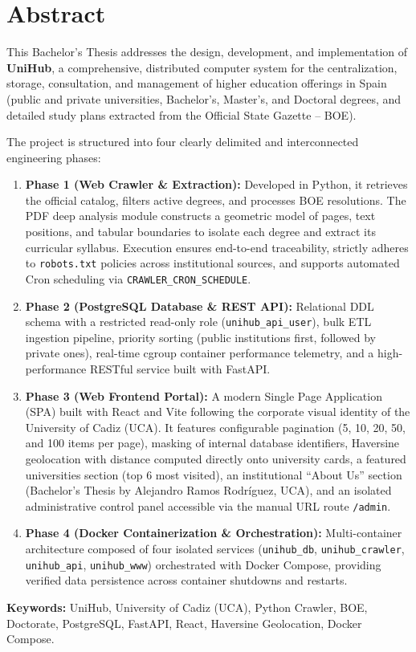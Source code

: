 \newpage{\ }
\thispagestyle{empty}
\chapter*{Abstract}

\noindent This Bachelor's Thesis addresses the design, development, and implementation of \textbf{UniHub}, a comprehensive, distributed computer system for the centralization, storage, consultation, and management of higher education offerings in Spain (public and private universities, Bachelor's, Master's, and Doctoral degrees, and detailed study plans extracted from the Official State Gazette -- BOE).

The project is structured into four clearly delimited and interconnected engineering phases:
\begin{enumerate}
    \item \textbf{Phase 1 (Web Crawler \& Extraction):} Developed in Python, it retrieves the official catalog, filters active degrees, and processes BOE resolutions. The PDF deep analysis module constructs a geometric model of pages, text positions, and tabular boundaries to isolate each degree and extract its curricular syllabus. Execution ensures end-to-end traceability, strictly adheres to \texttt{robots.txt} policies across institutional sources, and supports automated Cron scheduling via \texttt{CRAWLER\_CRON\_SCHEDULE}.
    \item \textbf{Phase 2 (PostgreSQL Database \& REST API):} Relational DDL schema with a restricted read-only role (\texttt{unihub\_api\_user}), bulk ETL ingestion pipeline, priority sorting (public institutions first, followed by private ones), real-time cgroup container performance telemetry, and a high-performance RESTful service built with FastAPI.
    \item \textbf{Phase 3 (Web Frontend Portal):} A modern Single Page Application (SPA) built with React and Vite following the corporate visual identity of the University of Cadiz (UCA). It features configurable pagination (5, 10, 20, 50, and 100 items per page), masking of internal database identifiers, Haversine geolocation with distance computed directly onto university cards, a featured universities section (top 6 most visited), an institutional ``About Us'' section (Bachelor's Thesis by Alejandro Ramos Rodríguez, UCA), and an isolated administrative control panel accessible via the manual URL route \texttt{/admin}.
    \item \textbf{Phase 4 (Docker Containerization \& Orchestration):} Multi-container architecture composed of four isolated services (\texttt{unihub\_db}, \texttt{unihub\_crawler}, \texttt{unihub\_api}, \texttt{unihub\_www}) orchestrated with Docker Compose, providing verified data persistence across container shutdowns and restarts.
\end{enumerate}

\vspace{.5cm}

\noindent \textbf{Keywords:} UniHub, University of Cadiz (UCA), Python Crawler, BOE, Doctorate, PostgreSQL, FastAPI, React, Haversine Geolocation, Docker Compose.
